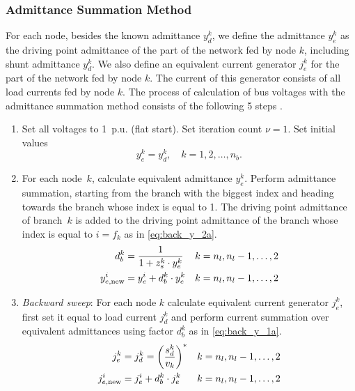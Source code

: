 \documentclass[12pt]{article}
\newcommand{\cc}[1]{{#1}^{\ast}}                        %
\numberwithin{equation}{section}
\numberwithin{table}{section}
\numberwithin{figure}{section}
\begin{document}
\subsubsection{Admittance Summation Method}
For each node, besides the known admittance $y_d^k$, we define the admittance $y_e^k$ as the driving point admittance of the part of the network fed by node $k$, including shunt admittance $y_d^k$. We also define an equivalent current generator $j_e^k$ for the part of the network fed by node $k$. The current of this generator consists of all load currents fed by node $k$.
The process of calculation of bus voltages with the admittance summation method consists of the following 5 steps \cite{rajicic1998}.

\begin{enumerate}
  
  \item Set all voltages to 1~p.u. (flat start). Set iteration count $\nu = 1$. Set initial values
  \begin{equation}
    y_e^k = y_d^k, \quad k = 1, 2, \ldots ,n_b.
  \end{equation}

  \item For each node~$k$, calculate equivalent admittance $y_e^k$. Perform admittance summation, starting from the branch with the biggest index and heading towards the branch whose index is equal to 1. The driving point admittance of branch~$k$ is added to the driving point admittance of the branch whose index is equal to $i = f_k$ as in \eqref{eq:back_y_2a}.
  \begin{align}
  d_b^k &= \frac{1}{1 + z_s^k \cdot y_e^k} & k = n_l, n_l - 1, \ldots ,2
  \label{eq:back_y_1a}
  \\
  y_{e,{\rm new}}^i &= y_e^i + d_b^k \cdot y_e^k & k = n_l, n_l - 1, \ldots ,2
  \label{eq:back_y_2a}
  \end{align}
 
  \item \textit{Backward sweep}: For each node $k$ calculate equivalent current generator $j_e^k$, first set it equal to load current $j_d^k$ and perform current summation over equivalent admittances using factor $d_b^k$ as in \eqref{eq:back_y_1a}.
  \begin{align}
  j_e^k &= j_d^k = \cc{\left(\frac{s_d^k}{v_k}\right)} & k = n_l, n_l - 1, \ldots ,2
  \label{eq:back_y_1}
  \\
  j_{e,{\rm new}}^i &= j_e^i + d_b^k \cdot j_e^k & k = n_l, n_l - 1, \ldots ,2
  \label{eq:back_y_2}
  \end{align}
  \label{step3y}
  

\end{enumerate}
\end{document}
